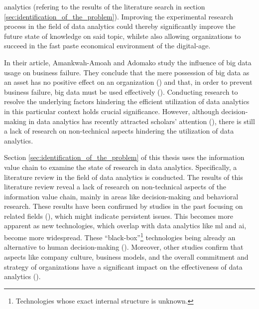 analytics (refering to the results of the literature search in section \ref{sec:identification_of_the_problem}). Improving the experimental research process in the field of data analytics could thereby significantly improve the future state of knowledge on said topic, whilste also allowing organizations to succeed in the fast paste economical environment of the digital-age.

In their article, Amankwah-Amoah and Adomako study the influence of big data usage on business failure. They conclude that the mere possession of big data as an asset has no positive effect on an organization (\cite{AmankwahAmoah.2019}) and that, in order to prevent business failure, big data must be used effectively (\cite{AmankwahAmoah.2019}). Conducting research to resolve the underlying factors hindering the efficient utilization of data analytics in this particular context holds crucial significance. However, although decision-making in data analytics has recently attracted scholars' attention (\cite{Chen.2022}), there is still a lack of research on non-technical aspects hindering the utilization of data analytics.

Section \ref{sec:identification_of_the_problem} of this thesis uses the information value chain to examine the state of research in data analytics. Specifically, a literature review in the field of data analytics is conducted. The results of this literature review reveal a lack of research on non-technical aspects of the information value chain, mainly in areas like decision-making and behavioral research. These results have been confirmed by studies in the past focusing on related fields (\cite{Trieu.2017}), which might indicate persistent issues. This becomes more apparent as new technologies, which overlap with data analytics like \ac{ml} and \ac{ai}, become more widespread. These \enquote{black-box}\footnote{Technologies whose exact internal structure is unknown.} technologies being already an alternative to human decision-making (\cite{Krakowski.2023}). Moreover, other studies confirm that aspects like company culture, business models, and the overall commitment and strategy of organizations have a significant impact on the effectiveness of data analytics (\cite{Holsapple.2014}).

